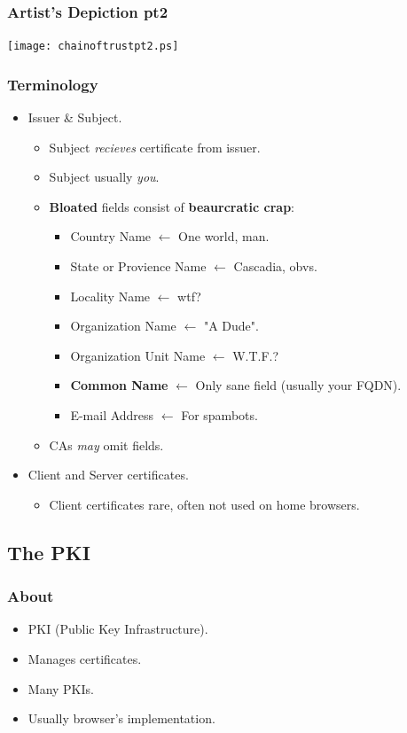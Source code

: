 \documentclass[xcolor={dvipsnames,svgnames},hyperref=dvips]{beamer}
\begin{document}
	\begin{frame}
		\frametitle{Artist's Depiction pt2}
		\center\texttt{[image: chainoftrustpt2.ps]}
	\end{frame}

	\begin{frame}
		\frametitle{Terminology}
		\begin{itemize}
		\item Issuer \& Subject.
			\begin{itemize}
			\item Subject \textit{recieves} certificate from issuer.
			\item Subject usually \textit{you}.
			\item \textbf{Bloated} fields consist of \textbf{beaurcratic crap}:
				\begin{itemize}
				\item Country Name $\leftarrow$ One world, man.
				\item State or Provience Name $\leftarrow$ Cascadia, obvs.
				\item Locality Name $\leftarrow$ wtf?
				\item Organization Name $\leftarrow$ "A Dude".
				\item Organization Unit Name $\leftarrow$ W.T.F.?
				\item \textbf{Common Name} $\leftarrow$ Only sane field (usually your FQDN).
				\item E-mail Address $\leftarrow$ For spambots.
				\end{itemize}
			\item CAs \textit{may} omit fields.
			\end{itemize}
		\item Client and Server certificates.
			\begin{itemize}
			\item Client certificates rare, often not used on home browsers.
			\end{itemize}
		\end{itemize}
	\end{frame}

\subsection{The PKI}
	\begin{frame}
		\frametitle{About}
		\begin{itemize}
		\item PKI (Public Key Infrastructure).
		\item Manages certificates.
		\item Many PKIs.
		\item Usually browser's implementation.
		\end{itemize}
	\end{frame}
\end{document}
